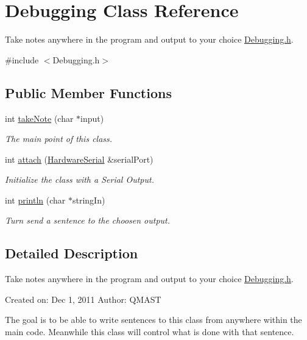 \hypertarget{classDebugging}{
\section{\-Debugging \-Class \-Reference}
\label{classDebugging}
}


\-Take notes anywhere in the program and output to your choice \hyperlink{Debugging_8h_source}{\-Debugging.\-h}.  




{\ttfamily \#include $<$\-Debugging.\-h$>$}

\subsection*{\-Public \-Member \-Functions}
\begin{DoxyCompactItemize}
\item 
int \hyperlink{classDebugging_a6c915eb80d0f20fabcbfb10e82041e89}{take\-Note} (char $\ast$input)
\begin{DoxyCompactList}\small\item\em \-The main point of this class. \end{DoxyCompactList}\item 
int \hyperlink{classDebugging_abb629b4360ea31719550d03f96635ccb}{attach} (\hyperlink{classHardwareSerial}{\-Hardware\-Serial} \&serial\-Port)
\begin{DoxyCompactList}\small\item\em \-Initialize the class with a \-Serial \-Output. \end{DoxyCompactList}\item 
int \hyperlink{classDebugging_ae74b8c5d0f8445f098ffd07bab368f0a}{println} (char $\ast$string\-In)
\begin{DoxyCompactList}\small\item\em \-Turn send a sentence to the choosen output. \end{DoxyCompactList}\end{DoxyCompactItemize}


\subsection{\-Detailed \-Description}
\-Take notes anywhere in the program and output to your choice \hyperlink{Debugging_8h_source}{\-Debugging.\-h}. 

\-Created on\-: \-Dec 1, 2011 \-Author\-: \-Q\-M\-A\-S\-T

\-The goal is to be able to write sentences to this class from anywhere within the main code. \-Meanwhile this class will control what is done with that sentence.


